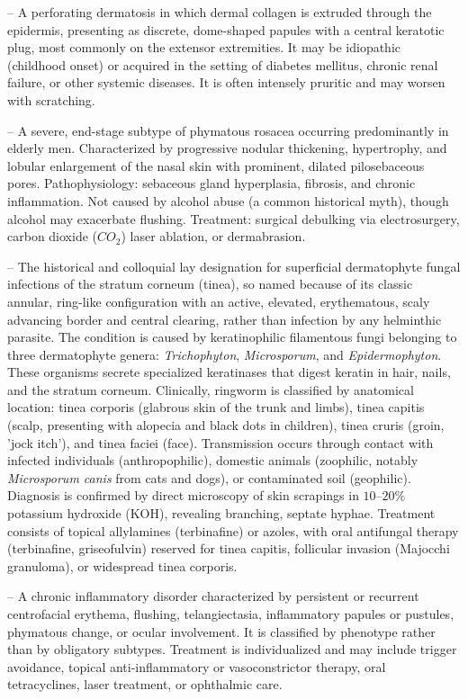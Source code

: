 -- A perforating dermatosis in which dermal collagen is extruded through the epidermis, presenting as discrete, dome-shaped papules with a central keratotic plug, most commonly on the extensor extremities. It may be idiopathic (childhood onset) or acquired in the setting of diabetes mellitus, chronic renal failure, or other systemic diseases. It is often intensely pruritic and may worsen with scratching.

-- A severe, end-stage subtype of phymatous rosacea occurring predominantly in elderly men. Characterized by progressive nodular thickening, hypertrophy, and lobular enlargement of the nasal skin with prominent, dilated pilosebaceous pores. Pathophysiology: sebaceous gland hyperplasia, fibrosis, and chronic inflammation. Not caused by alcohol abuse (a common historical myth), though alcohol may exacerbate flushing. Treatment: surgical debulking via electrosurgery, carbon dioxide ($CO_2$) laser ablation, or dermabrasion.

-- The historical and colloquial lay designation for superficial dermatophyte fungal infections of the stratum corneum (tinea), so named because of its classic annular, ring-like configuration with an active, elevated, erythematous, scaly advancing border and central clearing, rather than infection by any helminthic parasite. The condition is caused by keratinophilic filamentous fungi belonging to three dermatophyte genera: \textit{Trichophyton}, \textit{Microsporum}, and \textit{Epidermophyton}. These organisms secrete specialized keratinases that digest keratin in hair, nails, and the stratum corneum. Clinically, ringworm is classified by anatomical location: tinea corporis (glabrous skin of the trunk and limbs), tinea capitis (scalp, presenting with alopecia and black dots in children), tinea cruris (groin, 'jock itch'), and tinea faciei (face). Transmission occurs through contact with infected individuals (anthropophilic), domestic animals (zoophilic, notably \textit{Microsporum canis} from cats and dogs), or contaminated soil (geophilic). Diagnosis is confirmed by direct microscopy of skin scrapings in $10\text{--}20\%$ potassium hydroxide (KOH), revealing branching, septate hyphae. Treatment consists of topical allylamines (terbinafine) or azoles, with oral antifungal therapy (terbinafine, griseofulvin) reserved for tinea capitis, follicular invasion (Majocchi granuloma), or widespread tinea corporis.

-- A chronic inflammatory disorder characterized by persistent or recurrent centrofacial erythema, flushing, telangiectasia, inflammatory papules or pustules, phymatous change, or ocular involvement. It is classified by phenotype rather than by obligatory subtypes. Treatment is individualized and may include trigger avoidance, topical anti-inflammatory or vasoconstrictor therapy, oral tetracyclines, laser treatment, or ophthalmic care.

